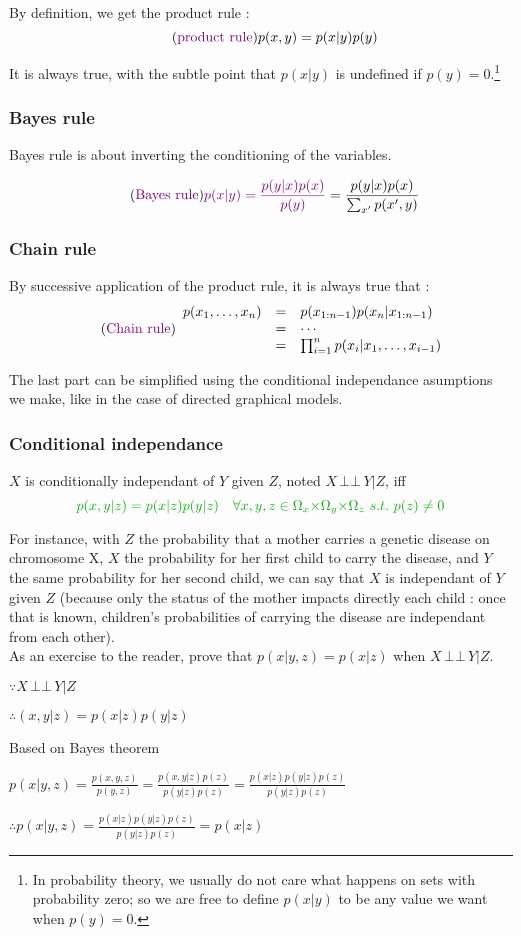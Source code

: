 \documentclass[12pt]{report}
\newcommand{\defobj}[1]{\color{red}#1\color{black}{}}
\newcommand{\defmean}[1]{\color{green!70!black}#1\color{black}{}}
\renewcommand{\emph}[1]{\color{violet}#1\color{black}{}}
\newcommand{\indep}{\ensuremath{\,\bot\!\!\!\bot\,}} %
\begin{document}
By definition, we get the product rule :
\[\tag{\emph{product rule}}
p(x,y) = p(x|y)p(y)\]

It is always true, with the subtle point that $p(x|y)$ is undefined if $p(y) = 0$.\footnote{In probability theory, we usually do not care what happens on sets with probability zero; so we are free to define $p(x|y)$ to be any value we want when $p(y)=0$.}

\subsubsection{Bayes rule}

Bayes rule is about inverting the conditioning of the variables.

\[\tag{\emph{Bayes rule}}
\emph{p(x|y) = \frac{p(y|x)p(x)}{p(y)}} = \frac{p(y|x)p(x)}{\sum_{x'}p(x',y)}
\]

\subsubsection{Chain rule}

By successive application of the product rule, it is always true that :
\[\tag{\emph{Chain rule}}
\begin{array}{r l l}
  p(x_1, \ldots, x_n) &=&p(x_{1:n-1})p(x_n|x_{1:n-1})\\
  &=& \cdots\\
  &=& \prod_{i=1}^{n} p(x_i|x_1,\ldots,x_{i-1})
\end{array}
\]

The last part can be simplified using the conditional independance
asumptions we make, like in the case of directed graphical models.

\subsubsection{Conditional independance}

\defobj{$X$ is conditionally independant of $Y$ given $Z$}, noted \defobj{$X \indep Y | Z$}, iff
\[\defmean{p(x,y|z) = p(x|z)p(y|z) \quad \medmuskip=0mu \forall x,y,z \in \Omega_x \times \Omega_y \times \Omega_z\ s.t.\ p(z) \neq 0}\]

For instance, with $Z$ the probability that a mother carries a genetic disease
on chromosome X, $X$ the probability for her first child to carry the disease,
and $Y$ the same probability for her second child, we can say that $X$ is
independant of $Y$ given $Z$ (because only the status of the mother impacts
directly each child : once that is known, children's probabilities of carrying the
disease are independant from each other).
\newline\\
As an exercise to the reader, prove that $p(x|y,z) = p(x|z)$ when $X\indep Y |Z$.

$\because X\indep Y |Z$

$\therefore (x,y|z)=p(x|z)p(y|z)$

Based on Bayes theorem

$p(x|y,z)=\frac{p(x,y,z)}{p(y,z)}=\frac{p(x,y|z)p(z)}{p(y|z)p(z)}=\frac{p(x|z)p(y|z)p(z)}{p(y|z)p(z)}$

$\therefore p(x|y,z)=\frac{p(x|z)p(y|z)p(z)}{p(y|z)p(z)}=p(x|z)$
\end{document}

